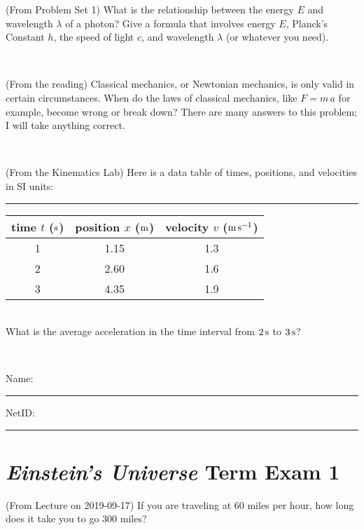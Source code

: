 \documentclass[12pt, letterpaper]{article}
\begin{document}
\begin{problem} (From Problem Set 1)
What is the relationship between the energy $E$ and wavelength
$\lambda$ of a photon? Give a formula that involves energy $E$,
Planck's Constant $h$, the speed of light $c$, and wavelength
$\lambda$ (or whatever you need).
\end{problem}

\vfill ~

\begin{problem} (From the reading)
Classical mechanics, or Newtonian mechanics, is only valid in certain
circumstances. When do the laws of classical mechanics, like $F =
m\,a$ for example, become wrong or break down? There are many answers
to this problem; I will take anything correct.
\end{problem}


\vfill ~

\begin{problem} (From the Kinematics Lab)
Here is a data table of times, positions, and velocities in SI units:\\
\rule{1.0in}{0pt}\begin{tabular}{c|c|c}
time $t$ ($\mathrm{s}$) & position $x$ ($\mathrm{m}$) & velocity $v$ ($\mathrm{m}\,\mathrm{s}^{-1}$) \\
\hline
1 & 1.15 & 1.3 \\
2 & 2.60 & 1.6 \\
3 & 4.35 & 1.9 \\
\hline
\end{tabular}\\
What is the average acceleration in the time interval from $2\,\mathrm{s}$ to $3\,\mathrm{s}$?
\end{problem}


\vfill ~


\cleardoublepage



\noindent
Name: \rule[-1ex]{0.60\textwidth}{0.1pt}
NetID: \rule[-1ex]{0.20\textwidth}{0.1pt}

\section*{\textsl{Einstein's Universe} Term Exam 1}
\setcounter{problem}{1}


\begin{problem} (From Lecture on 2019-09-17)
If you are traveling at 60 miles per hour, how long does
it take you to go 300 miles?
\end{problem}


\vfill ~
\end{document}
